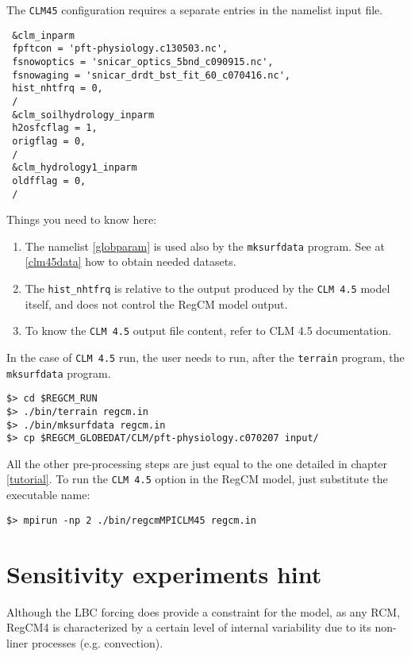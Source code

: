 The \verb=CLM45= configuration requires a separate entries in the namelist input
file.

{\footnotesize
\begin{Verbatim}
 &clm_inparm
 fpftcon = 'pft-physiology.c130503.nc',
 fsnowoptics = 'snicar_optics_5bnd_c090915.nc',
 fsnowaging = 'snicar_drdt_bst_fit_60_c070416.nc',
 hist_nhtfrq = 0,
 /
 &clm_soilhydrology_inparm
 h2osfcflag = 1,
 origflag = 0,
 /
 &clm_hydrology1_inparm
 oldfflag = 0,
 /
\end{Verbatim}
}

Things you need to know here:

\begin{enumerate}
\item The namelist \ref{globparam} is used also by the \verb=mksurfdata=
program. See at \ref{clm45data} how to obtain needed datasets.
\item The \verb=hist_nhtfrq= is relative to the output produced by the
\verb=CLM 4.5= model itself, and does not control the RegCM model output.
\item To know the \verb=CLM 4.5= output file content, refer to CLM 4.5
documentation.
\end{enumerate}

In the case of \verb=CLM 4.5= run, the user needs to run, after the
\verb=terrain= program, the \verb=mksurfdata= program.

\begin{Verbatim}
$> cd $REGCM_RUN
$> ./bin/terrain regcm.in
$> ./bin/mksurfdata regcm.in
$> cp $REGCM_GLOBEDAT/CLM/pft-physiology.c070207 input/
\end{Verbatim}

All the other pre-processing steps are just equal to the one detailed in
chapter \ref{tutorial}. To run the \verb=CLM 4.5= option in the RegCM model,
just substitute the executable name:

\begin{Verbatim}
$> mpirun -np 2 ./bin/regcmMPICLM45 regcm.in
\end{Verbatim}

\section{Sensitivity experiments hint}

Although the LBC forcing does provide a constraint for the model, as any RCM,
RegCM4 is characterized by a certain level of internal variability due to its
non-liner processes (e.g. convection).

